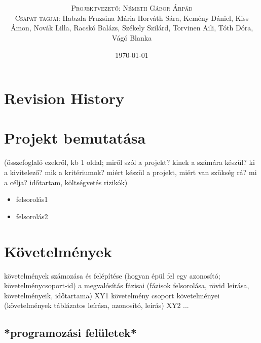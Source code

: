 \documentclass{article}
\title{\textbf{\BoldTitle}\\\Subtitle}
\author{\textsc{\Large Projektvezető: Németh Gábor Árpád} \\ \textsc{Csapat tagjai:} Habzda Fruzsina Mária Horváth Sára, Kemény Dániel, Kiss Ámon, Novák Lilla, Racskó Balázs, Székely Szilárd, Torvinen Aili, Tóth Dóra, Vágó Blanka}
\date{\today}
\begin{document}
\maketitle

\pagebreak
\tableofcontents %

\pagebreak
\section{Revision History}

\begin{versionhistory}
\end{versionhistory}


\pagebreak
\section{Projekt bemutatása}

(összefoglaló ezekről, kb 1 oldal;
miről szól a projekt?
kinek a számára készül?
ki a kivitelező?
mik a kritériumok?
miért készül a projekt, miért van szükség rá?
mi a célja?
időtartam, költségvetés
rizikók)


\begin{itemize}
\item felsorolás1
\item felsorolás2
\end{itemize}


\pagebreak
\section{Követelmények}

követelmények számozása és felépítése (hogyan épül fel egy azonosító; követelménycsoport-id)
a megvalósítás fázisai (fázisok felsorolása, rövid leírása, követelményeik, időtartama) 
XY1 követelmény csoport követelményei (követelmények táblázatos leírása, azonosító, leírás)
XY2 ...

\subsection{*programozási felületek*}
\end{document}
